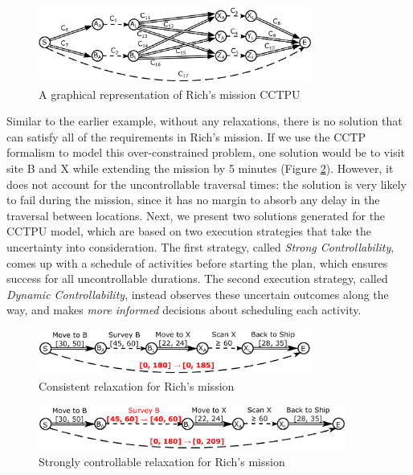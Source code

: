 \documentclass[jair,twoside,11pt,theapa]{article}
\begin{document}
\begin{figure}[h!]
	\centering
	\includegraphics[width=0.80\textwidth]{figures/example_cctpu.pdf}  
	\caption{A graphical representation of Rich's mission CCTPU}
	\label{fig:example_cctpu}
\end{figure}


Similar to the earlier example, without any relaxations, there is no solution
that can satisfy all of the requirements in Rich's mission. If we use the CCTP
formalism to model this over-constrained problem, one solution would be to visit
site B and X while extending the mission by 5 minutes (Figure
\ref{fig:ConsistentSolution}). However, it does not account for the
uncontrollable traversal times: the solution is very likely to fail during the
mission, since it has no margin to absorb any delay in the traversal between
locations. Next, we present two solutions generated for the CCTPU model, which
are based on two execution strategies that take the uncertainty into
consideration. The first strategy, called \textit{Strong Controllability}, comes
up with a schedule of activities before starting the plan, which ensures success
for all uncontrollable durations. The second execution strategy, called
\textit{Dynamic Controllability}, instead observes these uncertain outcomes
along the way, and makes \textit{more informed} decisions about scheduling each
activity.


\begin{figure}[!ht]
	\centering
	\includegraphics[width=0.8\textwidth]{figures/solution_consistent.pdf} 
	\caption{Consistent relaxation for Rich's mission}
	\label{fig:ConsistentSolution}
\end{figure}

\begin{figure}[ht!]
	\centering
	\includegraphics[width=0.9\textwidth]{figures/solution_sc.pdf}
	\caption{Strongly controllable relaxation for Rich's mission}
	\label{fig:SCSolution}
\end{figure}
\end{document}
